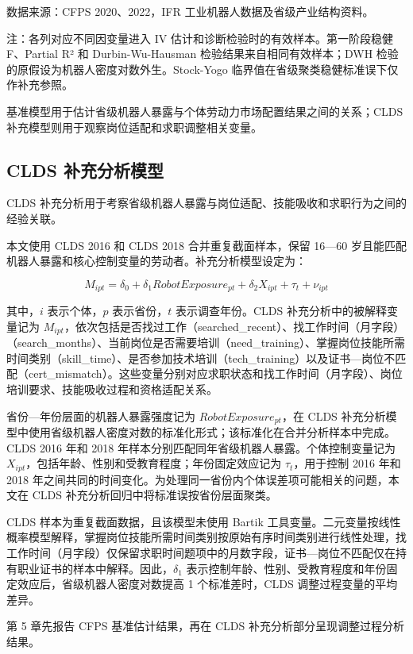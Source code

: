 \documentclass[UTF8, zihao=-4, a4paper, openany, fontset=none]{ctexrep}
\numberwithin{equation}{chapter}
\begin{document}
数据来源：CFPS 2020、2022，IFR 工业机器人数据及省级产业结构资料。

注：各列对应不同因变量进入 IV 估计和诊断检验时的有效样本。第一阶段稳健 F、Partial R² 和 Durbin-Wu-Hausman 检验结果来自相同有效样本；DWH 检验的原假设为机器人密度对数外生。Stock-Yogo 临界值在省级聚类稳健标准误下仅作补充参照。

基准模型用于估计省级机器人暴露与个体劳动力市场配置结果之间的关系；CLDS 补充模型则用于观察岗位适配和求职调整相关变量。

\subsection{CLDS 补充分析模型}\label{clds-ux8865ux5145ux5206ux6790ux6a21ux578b}

CLDS 补充分析用于考察省级机器人暴露与岗位适配、技能吸收和求职行为之间的经验关联。

本文使用 CLDS 2016 和 CLDS 2018 合并重复截面样本，保留 16---60 岁且能匹配机器人暴露和核心控制变量的劳动者。补充分析模型设定为：

\[
M_{ipt}=\delta_0+\delta_1RobotExposure_{pt}+\delta_2X_{ipt}+\tau_t+\nu_{ipt}
\]

其中，\(i\) 表示个体，\(p\) 表示省份，\(t\) 表示调查年份。CLDS 补充分析中的被解释变量记为 \(M_{ipt}\)，依次包括是否找过工作（searched\_recent）、找工作时间（月字段）（search\_months）、当前岗位是否需要培训（need\_training）、掌握岗位技能所需时间类别（skill\_time）、是否参加技术培训（tech\_training）以及证书---岗位不匹配（cert\_mismatch）。这些变量分别对应求职状态和找工作时间（月字段）、岗位培训要求、技能吸收过程和资格适配关系。

省份---年份层面的机器人暴露强度记为 \(RobotExposure_{pt}\)，在 CLDS 补充分析模型中使用省级机器人密度对数的标准化形式；该标准化在合并分析样本中完成。CLDS 2016 年和 2018 年样本分别匹配同年省级机器人暴露。个体控制变量记为 \(X_{ipt}\)，包括年龄、性别和受教育程度；年份固定效应记为 \(\tau_t\)，用于控制 2016 年和 2018 年之间共同的时间变化。为处理同一省份内个体误差项可能相关的问题，本文在 CLDS 补充分析回归中将标准误按省份层面聚类。

CLDS 样本为重复截面数据，且该模型未使用 Bartik 工具变量。二元变量按线性概率模型解释，掌握岗位技能所需时间类别按原始有序时间类别进行线性处理，找工作时间（月字段）仅保留求职时间题项中的月数字段，证书---岗位不匹配仅在持有职业证书的样本中解释。因此，\(\delta_1\) 表示控制年龄、性别、受教育程度和年份固定效应后，省级机器人密度对数提高 1 个标准差时，CLDS 调整过程变量的平均差异。

第 5 章先报告 CFPS 基准估计结果，再在 CLDS 补充分析部分呈现调整过程分析结果。
\end{document}
